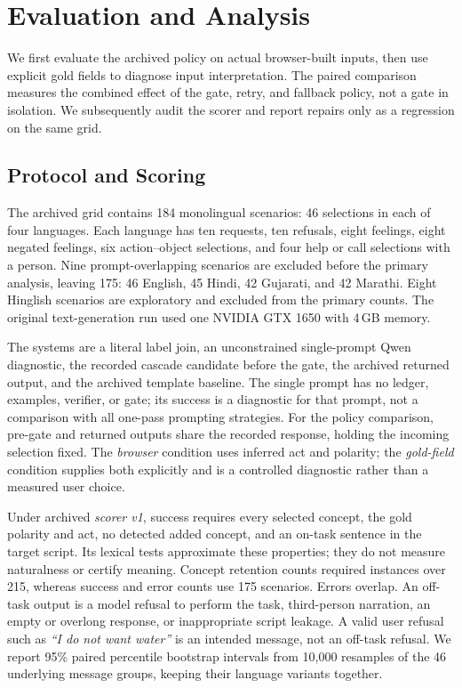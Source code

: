 \section{Evaluation and Analysis}
\label{sec:eval}
We first evaluate the archived policy on actual browser-built inputs, then use explicit gold fields to diagnose input interpretation.
The paired comparison measures the combined effect of the gate, retry, and fallback policy, not a gate in isolation.
We subsequently audit the scorer and report repairs only as a regression on the same grid.

\subsection{Protocol and Scoring}
The archived grid contains 184 monolingual scenarios: 46 selections in each of four languages.
Each language has ten requests, ten refusals, eight feelings, eight negated feelings, six action--object selections, and four help or call selections with a person.
Nine prompt-overlapping scenarios are excluded before the primary analysis, leaving 175: 46 English, 45 Hindi, 42 Gujarati, and 42 Marathi.
Eight Hinglish scenarios are exploratory and excluded from the primary counts.
The original text-generation run used one NVIDIA GTX 1650 with 4\,GB memory.

The systems are a literal label join, an unconstrained single-prompt Qwen diagnostic, the recorded cascade candidate before the gate, the archived returned output, and the archived template baseline.
The single prompt has no ledger, examples, verifier, or gate; its \Naive{} success is a diagnostic for that prompt, not a comparison with all one-pass prompting strategies.
For the policy comparison, pre-gate and returned outputs share the recorded response, holding the incoming selection fixed.
The \emph{browser} condition uses inferred act and polarity; the \emph{gold-field} condition supplies both explicitly and is a controlled diagnostic rather than a measured user choice.

Under archived \emph{scorer v1}, success requires every selected concept, the gold polarity and act, no detected added concept, and an on-task sentence in the target script.
Its lexical tests approximate these properties; they do not measure naturalness or certify meaning.
Concept retention counts required instances over 215, whereas success and error counts use 175 scenarios.
Errors overlap.
An off-task output is a model refusal to perform the task, third-person narration, an empty or overlong response, or inappropriate script leakage.
A valid user refusal such as \emph{``I do not want water''} is an intended message, not an off-task refusal.
We report 95\% paired percentile bootstrap intervals from 10,000 resamples of the 46 underlying message groups, keeping their language variants together.


